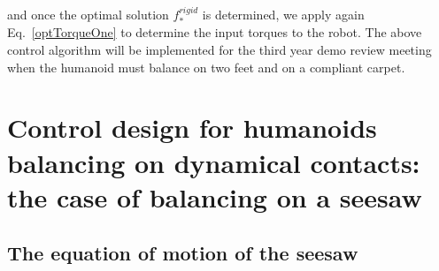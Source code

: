 \documentclass[12pt,a4paper,twoside]{article}
\begin{document}
and once the optimal solution  $f^{rigid}_*$ is determined, we apply again Eq.~\eqref{optTorqueOne} to determine the input torques to the robot. 
The above control algorithm will be implemented for the third year demo review meeting when the humanoid must balance on two feet and on a compliant carpet.



\section{Control design for  humanoids balancing on dynamical contacts: the case of balancing on a seesaw} 
\label{sec:controllerSeeSaw}

\subsection{The equation of motion of the seesaw} 
\label{sec:eqmotion}
\begin{figure}[t]
\end{figure}
\end{document}
